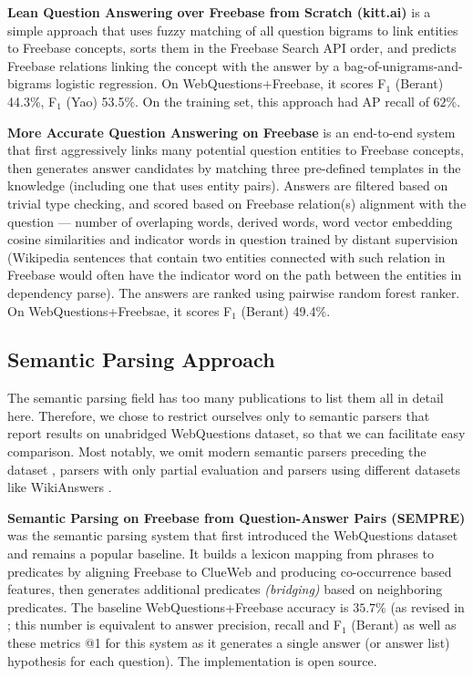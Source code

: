 \textbf{Lean Question Answering over Freebase from Scratch (kitt.ai)} \citep{LeanFreebaseYao}
	is a simple approach that uses
	fuzzy matching of all question bigrams to link entities to Freebase concepts,
	sorts them in the Freebase Search API order,
	and predicts Freebase relations linking the concept with the answer
	by a bag-of-unigrams-and-bigrams logistic regression.
	On WebQuestions+Freebase, it scores F$_1$ (Berant) 44.3\%, F$_1$ (Yao) 53.5\%.
	On the training set, this approach had AP recall of $62\%$.

\textbf{More Accurate Question Answering on Freebase} \citep{Aqqu}
	is an end-to-end system that first aggressively
	links many potential question entities to Freebase concepts,
	then generates answer candidates by matching three pre-defined
	templates in the knowledge (including one that uses entity pairs).
	Answers are filtered based on trivial type checking,
	and scored based on Freebase relation(s) alignment with
	the question --- number of overlaping words, derived words,
	word vector embedding cosine similarities and indicator
	words in question trained by distant supervision
	(Wikipedia sentences that contain two entities connected
	with such relation in Freebase would often have the indicator
	word on the path between the entities in dependency parse).
	The answers are ranked using pairwise random forest ranker.
	On WebQuestions+Freebsae, it scores F$_1$ (Berant) 49.4\%.

\subsection{Semantic Parsing Approach}

The semantic parsing field has too many publications to list them all
in detail here.  Therefore, we chose to restrict ourselves only to
semantic parsers that report results on unabridged WebQuestions dataset,
so that we can facilitate easy comparison.
Most notably, we omit modern semantic parsers preceding the dataset
\citep{SPKwiatkowski2013, SPCai2013},
parsers with only partial evaluation \citep{SPReddy2014}
and parsers using different datasets like WikiAnswers \cite{Fader2013Paraphrase}.

\textbf{Semantic Parsing on Freebase from Question-Answer Pairs (SEMPRE)} \citep{Semantic2013Berant}
	was the semantic parsing system that first introduced the WebQuestions dataset
	and remains a popular baseline.
	It builds a lexicon mapping from phrases to predicates
	by aligning Freebase to ClueWeb and producing co-occurrence
	based features, then generates
	additional predicates \textit{(bridging)}
	based on neighboring predicates.
	The baseline WebQuestions+Freebase accuracy is $35.7\%$
	(as revised in \cite{FreebaseQA2014Yao};
	this number is equivalent to answer precision, recall and F$_1$ (Berant)
	as well as these metrics @1
	for this system as it generates a single answer (or answer list)
	hypothesis for each question).
	The implementation is open source.

